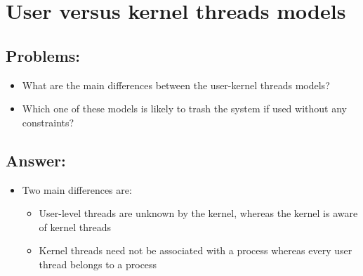 \section{User versus kernel threads models}
\subsection{Problems:}
\begin{itemize}
    \item What are the main differences between the user-kernel threads models? 
    \item Which one of these models is likely to trash the system if used without any constraints? 
\end{itemize}

\subsection{Answer:}

\begin{itemize}
    \item Two main differences are:
        \begin{itemize}
            \item User-level threads are unknown by the kernel, whereas the kernel is aware of kernel threads
            \item Kernel threads need not be associated with a process whereas every user thread belongs to a process
        \end{itemize}
\end{itemize}
